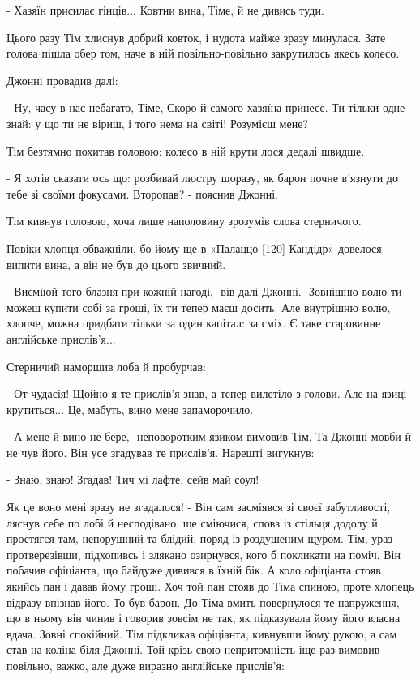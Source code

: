 - Хазяїн присилає гінців... Ковтни вина, Тіме, й не дивись туди.

Цього разу Тім хлиснув добрий ковток, і нудота майже зразу минулася. Зате голова пішла обер том, наче в ній повільно-повільно закрутилось якесь колесо.

Джонні провадив далі:

- Ну, часу в нас небагато, Тіме, Скоро й самого хазяїна принесе. Ти тільки одне знай: у що ти не віриш, і того нема на світі! Розумієш мене?

Тім безтямно похитав головою: колесо в ній крути лося дедалі швидше.

- Я хотів сказати ось що: розбивай люстру щоразу, як барон почне в'язнути до тебе зі своїми фокусами. Второпав? - пояснив Джонні.

Тім кивнув головою, хоча лише наполовину зрозумів слова стерничого.

Повіки хлопця обважніли, бо йому ще в «Палаццо [120] Кандідр» довелося випити вина, а він не був до цього звичний.

- Висміюй того блазня при кожній нагоді,- вів далі Джонні.- Зовнішню волю ти можеш купити собі за гроші, їх ти тепер маєш досить. Але внутрішню волю, хлопче, можна придбати тільки за один капітал: за сміх. Є таке старовинне англійське прислів'я...

Стерничий наморщив лоба й пробурчав:

- От чудасія! Щойно я те прислів'я знав, а тепер вилетіло з голови. Але на язиці крутиться... Це, мабуть, вино мене запаморочило.

- А мене й вино не бере,- неповоротким язиком вимовив Тім. Та Джонні мовби й не чув його. Він усе згадував те прислів'я. Нарешті вигукнув:

- Знаю, знаю! Згадав! Тич мі лафте, сейв май соул!

Як це воно мені зразу не згадалося! - Він сам засміявся зі своєї забутливості, ляснув себе по лобі й несподівано, ще сміючися, сповз із стільця додолу й простягся там, непорушний та блідий, поряд із роздушеним щуром. Тім, ураз протверезівши, підхопивсь і злякано озирнувся, кого б покликати на поміч. Він побачив офіціанта, що байдуже дивився в їхній бік. А коло офіціанта стояв якийсь пан і давав йому гроші. Хоч той пан стояв до Тіма спиною, проте хлопець відразу впізнав його. То був барон. До Тіма вмить повернулося те напруження, що в ньому він чинив і говорив зовсім не так, як підказувала йому його власна вдача. Зовні спокійний. Тім підкликав офіціанта, кивнувши йому рукою, а сам став на коліна біля Джонні. Той крізь свою непритомність іще раз вимовив повільно, важко, але дуже виразно англійське прислів'я:

